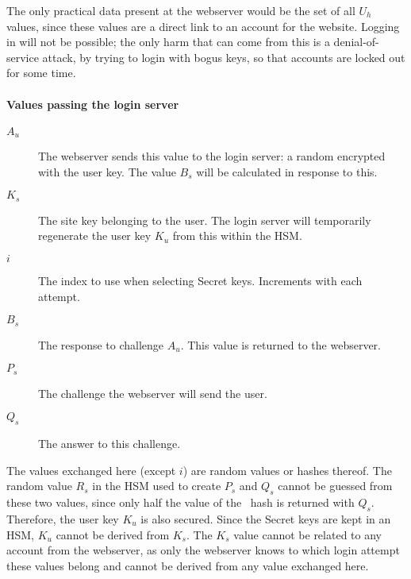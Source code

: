 The only practical data present at the webserver would be the set of all $U_h$ values,
since these values are a direct link to an account for the website.
Logging in will not be possible;
the only harm that can come from this is a denial-of-service attack,
by trying to login with bogus keys,
so that accounts are locked out for some time.
\paragraph{Values passing the login server}
\begin{description}
\item[$A_u$]	The webserver sends this value to the login server:
	a random encrypted with the user key.
	The value $B_s$ will be calculated in response to this.
\item[$K_s$]	The site key belonging to the user.
	The login server will temporarily regenerate the user key $K_u$ from this within the HSM.
\item[$i$]	The index to use when selecting Secret keys.
	Increments with each attempt.
\item[$B_s$]	The response to challenge $A_u$.
	This value is returned to the webserver.
\item[$P_s$]	The challenge the webserver will send the user.
\item[$Q_s$]	The answer to this challenge.
\end{description}
The values exchanged here
(except $i$)
are random values or hashes thereof.
The random value $R_s$ in the HSM used to create $P_s$ and $Q_s$ cannot be guessed from these two values,
since only half the value of the \SHA\ hash is returned with $Q_s$.
Therefore, the user key $K_u$ is also secured.
Since the Secret keys are kept in an HSM,
$K_u$ cannot be derived from $K_s$.
The $K_s$ value cannot be related to any account from the webserver,
as only the webserver knows to which login attempt these values belong
and cannot be derived from any value exchanged here.


